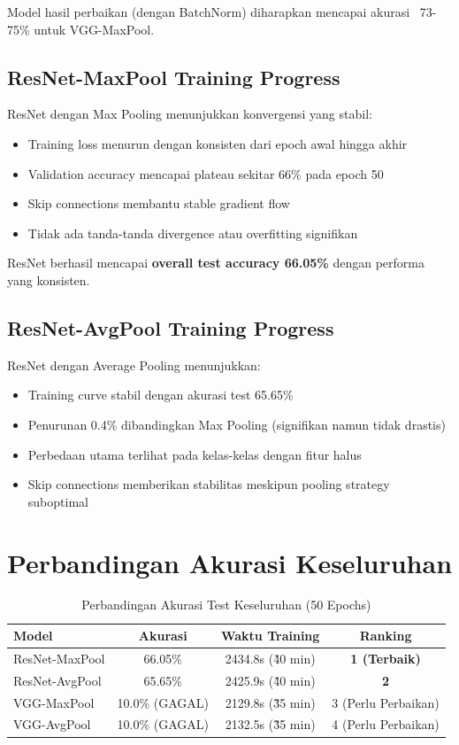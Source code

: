 \documentclass[12pt,a4paper]{report}
\begin{document}
Model hasil perbaikan (dengan BatchNorm) diharapkan mencapai akurasi ~73-75\% untuk VGG-MaxPool.

\subsection{ResNet-MaxPool Training Progress}

ResNet dengan Max Pooling menunjukkan konvergensi yang stabil:

\begin{itemize}
    \item Training loss menurun dengan konsisten dari epoch awal hingga akhir
    \item Validation accuracy mencapai plateau sekitar 66\% pada epoch 50
    \item Skip connections membantu stable gradient flow
    \item Tidak ada tanda-tanda divergence atau overfitting signifikan
\end{itemize}

ResNet berhasil mencapai \textbf{overall test accuracy 66.05\%} dengan performa yang konsisten.

\subsection{ResNet-AvgPool Training Progress}

ResNet dengan Average Pooling menunjukkan:

\begin{itemize}
    \item Training curve stabil dengan akurasi test 65.65\%
    \item Penurunan 0.4\% dibandingkan Max Pooling (signifikan namun tidak drastis)
    \item Perbedaan utama terlihat pada kelas-kelas dengan fitur halus
    \item Skip connections memberikan stabilitas meskipun pooling strategy suboptimal
\end{itemize}

\section{Perbandingan Akurasi Keseluruhan}

\begin{table}[H]
\centering
\caption{Perbandingan Akurasi Test Keseluruhan (50 Epochs)}
\begin{tabular}{|l|c|c|c|}
\hline
\textbf{Model} & \textbf{Akurasi} & \textbf{Waktu Training} & \textbf{Ranking} \\
\hline
ResNet-MaxPool & 66.05\% & 2434.8s (\~40 min) & \textbf{1 (Terbaik)} \\
\hline
ResNet-AvgPool & 65.65\% & 2425.9s (\~40 min) & \textbf{2} \\
\hline
VGG-MaxPool & 10.0\% (GAGAL) & 2129.8s (\~35 min) & 3 (Perlu Perbaikan) \\
\hline
VGG-AvgPool & 10.0\% (GAGAL) & 2132.5s (\~35 min) & 4 (Perlu Perbaikan) \\
\hline
\end{tabular}
\end{table}
\end{document}
